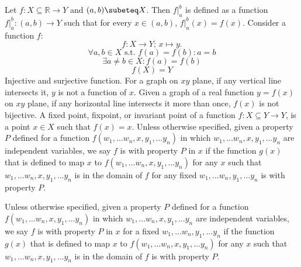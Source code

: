 \documentclass[a4paper,12pt]{report}
\begin{document}
Let $f\colon X\subseteq\mathbb{R}\to Y$ and $(a,b)\subeteq X$. Then $f\vert_a^b$ is defined as a function $f\vert_a^b\colon (a,b)\to Y$ such that for every $x\in (a,b)$, $f\vert_a^b(x)=f(x)$.
Consider a function $f$:
\[f\colon X\to Y;\,x\mapsto y.\]
\[\forall a,b\in X\text{\ s.t.\ } f(a)=f(b)\colon a=b\]
\[\exists a\neq b\in X\colon f(a)=f(b)\]
\[f(X)=Y\]
Injective and surjective function.
For a graph on $xy$ plane, if any vertical line intersects it, $y$ is not a function of $x$.
Given a graph of a real function $y=f(x)$ on $xy$ plane, if any horizontal line intersects it more than once, $f(x)$ is not bijective.
A fixed point, fixpoint, or invariant point of a function $f\colon X\subseteq Y\to Y$, is a point $x\in X$ such that $f(x)=x$.
Unless otherwise specified, given a property $P$ defined for a function $f(w_1,\dots w_n,x,y_1,\dots y_n)$ in which $w_1,\dots w_n,x,y_1,\dots y_n$ are independent variables, we say $f$ is with property $P$ in $x$ if the function $g(x)$ that is defined to map $x$ to $f(w_1,\dots w_n,x,y_1,\dots y_n)$ for any $x$ such that $w_1,\dots w_n,x,y_1,\dots y_n$ is in the domain of $f$ for any fixed $w_1,\dots w_n,y_1,\dots y_n$ is with property $P$.

Unless otherwise specified, given a property $P$ defined for a function $f(w_1,\dots w_n,x,y_1,\dots y_n)$ in which $w_1,\dots w_n,x,y_1,\dots y_n$ are independent variables, we say $f$ is with property $P$ in $x$ for a fixed $w_1,\dots w_n,y_1,\dots y_n$ if the function $g(x)$ that is defined to map $x$ to $f(w_1,\dots w_n,x,y_1,\dots y_n)$ for any $x$ such that $w_1,\dots w_n,x,y_1,\dots y_n$ is in the domain of $f$ is with property $P$.
\end{document}
